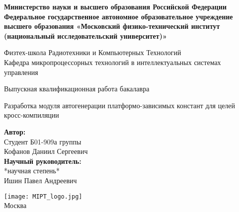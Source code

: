 \begin{center}
    \large\textbf{Министерство науки и высшего образования Российской Федерации
    Федеральное государственное автономное образовательное учреждение высшего образования
    «Московский физико-технический институт (национальный исследовательский университет)»} \\
    \vspace{1cm}

    Физтех-школа Радиотехники и Компьютерных Технологий \\

    Кафедра микропроцессорных технологий в интеллектуальных системах управления \\

    \vspace{3em}

    Выпускная квалификационная работа бакалавра
\end{center}

\begin{center}
    \vspace{\fill}
    \LARGE{Разработка модуля автогенерации платформо-зависимых констант для целей кросс-компиляции}

    \vspace{\fill}
\end{center}


\begin{flushright}
    \textbf{Автор:} \\
    Студент Б01-909а группы \\
    Кофанов Даниил Сергеевич \\
    \vspace{2em}
    \textbf{Научный руководитель:} \\
    *научная степень* \\
    Ишин Павел Андреевич \\
\end{flushright}

\vspace{7em}

\begin{center}
    \texttt{[image: MIPT\_logo.jpg]}\\
    Москва \the\year{}
\end{center}

\thispagestyle{empty}

\newpage
\setcounter{page}{2}
\fancyfoot[c]{\thepage}
\fancyhead[R]{}
